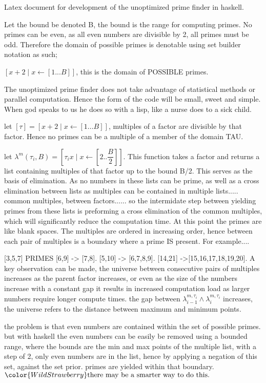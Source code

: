 Latex document for development of the
unoptimized prime finder in haskell.

Let the bound be denoted B, the bound is the range for computing primes.
No primes can be even, as all even numbers are divisible by 2, all primes
must be odd. Therefore the domain of possible primes is denotable using
set builder notation as such;

$[x+2\mid x\leftarrow[1...B]]$, this is the domain of POSSIBLE primes.

The unoptimized prime finder does not take advantage of statistical methods
or parallel computation. Hence the form of the code will be small, sweet
and simple. When god speaks to us he does so with a lisp, like a nurse does
to a sick child.

let $[\tau]=[x+2\mid x\leftarrow[1...B]]$, multiples of a factor are divisible by that factor.
Hence no primes can be a multiple of a member of the domain TAU.

let $\lambda^m(\tau_i,B)= [\tau_i x\mid x\leftarrow[2..\dfrac{B}{2}]]$. This function takes a factor and returns a list containing
multiples of that factor up to the bound B/2. This serves as the basis of elimination. As no numbers
in these lists can be prime, as well as a cross elimination between lists as multiples can be contained
in multiple lists..... common multiples, between factors...... so the intermidate step between yielding primes
from these lists is preforming a cross elimination of the common multiples, which will significantly reduce the
computation time. At this point the primes are like blank spaces. The multiples are ordered in increasing order,
hence between each pair of multiples is a boundary where a prime IS present. For example....

[3,5,7] PRIMES
[6,9] ->  [7,8].
[5,10] -> [6,7,8,9].
[14,21] ->[15,16,17,18,19,20]. A key observation can be made, the universe between consecutive pairs of
multiples increases as the parent factor increases, or even as the size of the numbers increase with a constant
gap it results in increased computation load as larger numbers require longer compute times.
the gap between $\lambda^{m,\tau_i}_{i-1}\land\lambda^{m,\tau_i}_i$ increases, the universe refers to the distance between maximum and minimum points.

the problem is that even numbers are contained within the set of possible primes. but with haskell the even numbers
can be easily be removed using a bounded range, where the bounds are the min and max points of the multiple list, with
a step of 2, only even numbers are in the list, hence by applying a negation of this set, against the set prior.
primes are yielded within that boundary. $\color{WildStrawberry}\text{there may be a smarter way to do this.}$


